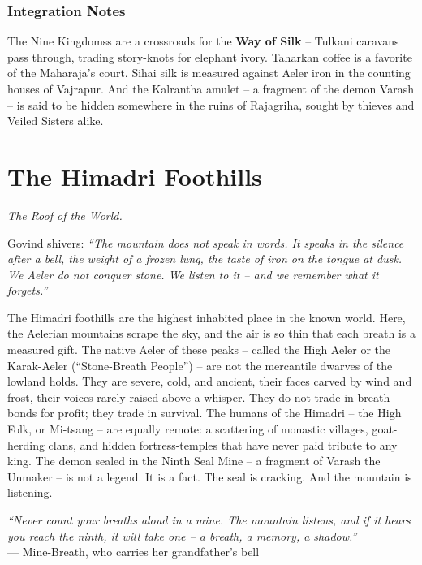 \documentclass[12pt,oneside]{book}
\begin{document}
\subsection*{Integration Notes}
The Nine Kingdomss are a crossroads for the \textbf{Way of Silk} -- Tulkani caravans pass through, trading story-knots for elephant ivory. Taharkan coffee is a favorite of the Maharaja's court. Sihai silk is measured against Aeler iron in the counting houses of Vajrapur. And the Kalrantha amulet -- a fragment of the demon Varash -- is said to be hidden somewhere in the ruins of Rajagriha, sought by thieves and Veiled Sisters alike.

\newpage

\newpage

\chapter{The Himadri Foothills}
\emph{The Roof of the World.}

\noindent
Govind shivers: \textit{``The mountain does not speak in words. It speaks in the silence after a bell, the weight of a frozen lung, the taste of iron on the tongue at dusk. We Aeler do not conquer stone. We listen to it -- and we remember what it forgets.''}

\noindent
The Himadri foothills are the highest inhabited place in the known world. Here, the Aelerian mountains scrape the sky, and the air is so thin that each breath is a measured gift. The native Aeler of these peaks -- called the High Aeler or the Karak-Aeler (``Stone-Breath People'') -- are not the mercantile dwarves of the lowland holds. They are severe, cold, and ancient, their faces carved by wind and frost, their voices rarely raised above a whisper. They do not trade in breath-bonds for profit; they trade in survival. The humans of the Himadri -- the High Folk, or Mi-tsang -- are equally remote: a scattering of monastic villages, goat-herding clans, and hidden fortress-temples that have never paid tribute to any king. The demon sealed in the Ninth Seal Mine -- a fragment of Varash the Unmaker -- is not a legend. It is a fact. The seal is cracking. And the mountain is listening.

\vspace{0.5em}
\noindent\textit{``Never count your breaths aloud in a mine. The mountain listens, and if it hears you reach the ninth, it will take one -- a breath, a memory, a shadow.''} \\
--- Mine-Breath, who carries her grandfather's bell
\end{document}
